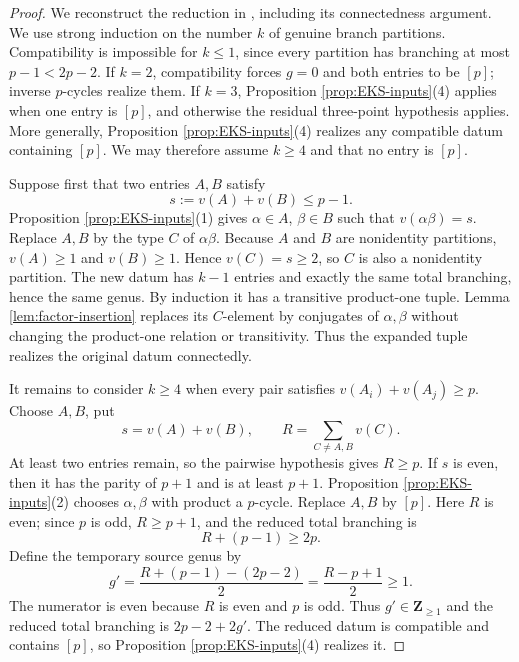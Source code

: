 \documentclass[11pt]{amsart}
\theoremstyle{plain}
\theoremstyle{definition}
\numberwithin{equation}{section}
\begin{document}
\begin{proof}
We reconstruct the reduction in \cite[Sections 4--5]{EKS}, including its
connectedness argument.  We use strong induction on the number $k$ of
genuine branch partitions.  Compatibility is impossible for $k\leq1$, since
every partition has branching at most $p-1<2p-2$.  If $k=2$, compatibility
forces $g=0$ and both entries to be $[p]$; inverse $p$-cycles realize them.
If $k=3$, Proposition \ref{prop:EKS-inputs}(4) applies when one entry is
$[p]$, and otherwise the residual three-point hypothesis applies.  More
generally, Proposition \ref{prop:EKS-inputs}(4) realizes any compatible datum
containing $[p]$.  We may therefore assume
$k\geq4$ and that no entry is $[p]$.

Suppose first that two entries $A,B$ satisfy
\[
 s:=v(A)+v(B)\leq p-1.
\]
Proposition \ref{prop:EKS-inputs}(1) gives $\alpha\in A$, $\beta\in B$ such that
$v(\alpha\beta)=s$.  Replace $A,B$ by the type $C$ of $\alpha\beta$.
Because $A$ and $B$ are nonidentity partitions, $v(A)\geq1$ and
$v(B)\geq1$.  Hence $v(C)=s\geq2$, so $C$ is also a nonidentity partition.
The new datum has $k-1$ entries and exactly the same total branching, hence
the same genus.  By induction it has a transitive product-one tuple.  Lemma
\ref{lem:factor-insertion} replaces its $C$-element by conjugates of
$\alpha,\beta$ without changing the product-one relation or transitivity.
Thus the expanded tuple realizes the original datum connectedly.

It remains to consider $k\geq4$ when every pair satisfies
$v(A_i)+v(A_j)\geq p$.  Choose $A,B$, put
\[
 s=v(A)+v(B),\qquad
 R=\sum_{C\ne A,B}v(C).
\]
At least two entries remain, so the pairwise hypothesis gives $R\geq p$.
If $s$ is even, then it has the parity of $p+1$ and is at least $p+1$.
Proposition \ref{prop:EKS-inputs}(2) chooses $\alpha,\beta$ with product a
$p$-cycle.  Replace
$A,B$ by $[p]$.  Here $R$ is even; since $p$ is odd, $R\geq p+1$, and the
reduced total branching is
\[
 R+(p-1)\geq2p.
\]
Define the temporary source genus by
\[
 g'=\frac{R+(p-1)-(2p-2)}2=\frac{R-p+1}{2}\geq1.
\]
The numerator is even because $R$ is even and $p$ is odd.  Thus
$g'\in\mathbf Z_{\geq1}$ and the reduced total branching is
$2p-2+2g'$.  The reduced datum is compatible and contains $[p]$, so
Proposition \ref{prop:EKS-inputs}(4) realizes it.


\end{proof}
\end{document}
